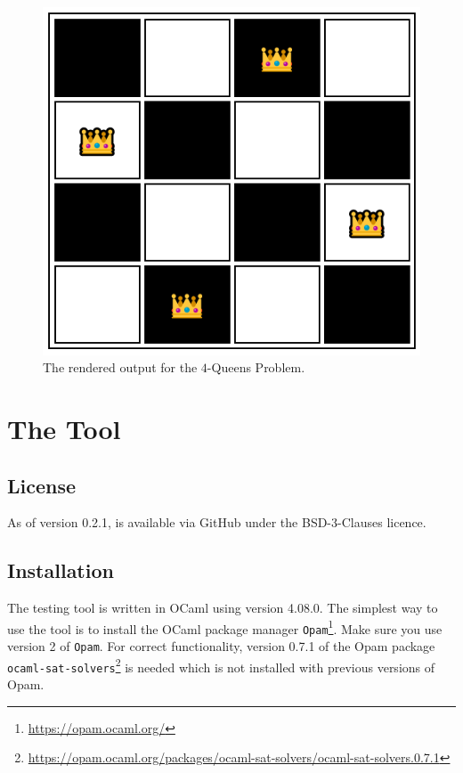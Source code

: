 \documentclass[twoside]{article}
\begin{document}
\begin{figure}
    \centering
    \includegraphics{pictures/4-Queens-Output.PNG}
    \caption{The rendered output for the $4$-Queens Problem. }
    \label{fig:n-Queens-Grafik}
\end{figure}



\appendix

\section{The \DiMo Tool}

\subsection{License}
As of version 0.2.1, \DiMo is available via GitHub under the BSD-3-Clauses licence.


\subsection{Installation}

The \DiMo testing tool is written in OCaml using version 4.08.0. The simplest way to use the tool is to install the OCaml package manager 
\texttt{Opam}\footnote{\url{https://opam.ocaml.org/}}. Make sure you use version 2 of \texttt{Opam}. For correct functionality, version 0.7.1 of the Opam package 
\texttt{ocaml-sat-solvers}\footnote{\url{https://opam.ocaml.org/packages/ocaml-sat-solvers/ocaml-sat-solvers.0.7.1}} is needed which is not installed with previous versions of Opam.
\end{document}
